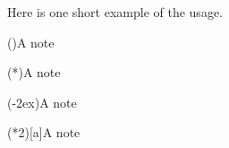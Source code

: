 \documentclass[load-preamble+]{cnltx-doc}
\begin{document}
Here is one short example of the usage.

\begin{sourcecode}
 
 
  \sidenote(){A note}
 
  \sidenote(*){A note}
 
  \sidenote(-2ex){A note}
 
  \sidenote(*2)[a]{A note}
\end{sourcecode}
\end{document}
